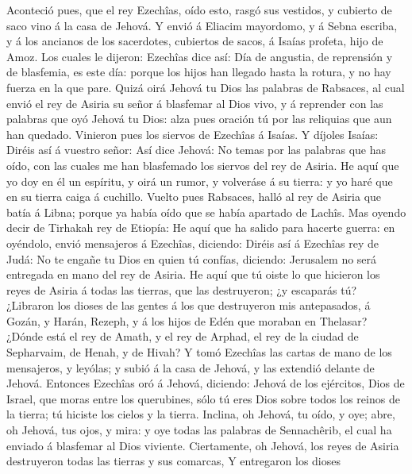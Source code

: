  Aconteció pues, que el rey Ezechîas, oído esto, rasgó sus
vestidos, y cubierto de saco vino á la casa de Jehová.  Y
envió á Eliacim mayordomo, y á Sebna escriba, y á los ancianos de los
sacerdotes, cubiertos de sacos, á Isaías profeta, hijo de Amoz.
 Los cuales le dijeron: Ezechîas dice así: Día de angustia,
de reprensión y de blasfemia, es este día: porque los hijos han llegado
hasta la rotura, y no hay fuerza en la que pare.  Quizá oirá
Jehová tu Dios las palabras de Rabsaces, al cual envió el rey de Asiria
su señor á blasfemar al Dios vivo, y á reprender con las palabras que
oyó Jehová tu Dios: alza pues oración tú por las reliquias que aun han
quedado.  Vinieron pues los siervos de Ezechîas á Isaías.
 Y díjoles Isaías: Diréis así á vuestro señor: Así dice
Jehová: No temas por las palabras que has oído, con las cuales me han
blasfemado los siervos del rey de Asiria.  He aquí que yo
doy en él un espíritu, y oirá un rumor, y volveráse á su tierra: y yo
haré que en su tierra caiga á cuchillo.  Vuelto pues
Rabsaces, halló al rey de Asiria que batía á Libna; porque ya había oído
que se había apartado de Lachîs.  Mas oyendo decir de
Tirhakah rey de Etiopía: He aquí que ha salido para hacerte guerra: en
oyéndolo, envió mensajeros á Ezechîas, diciendo:  Diréis
así á Ezechîas rey de Judá: No te engañe tu Dios en quien tú confías,
diciendo: Jerusalem no será entregada en mano del rey de Asiria.
 He aquí que tú oiste lo que hicieron los reyes de Asiria á
todas las tierras, que las destruyeron; ¿y escaparás tú? 
¿Libraron los dioses de las gentes á los que destruyeron mis
antepasados, á Gozán, y Harán, Rezeph, y á los hijos de Edén que moraban
en Thelasar?  ¿Dónde está el rey de Amath, y el rey de
Arphad, el rey de la ciudad de Sepharvaim, de Henah, y de Hivah?
 Y tomó Ezechîas las cartas de mano de los mensajeros, y
leyólas; y subió á la casa de Jehová, y las extendió delante de Jehová.
 Entonces Ezechîas oró á Jehová, diciendo: 
Jehová de los ejércitos, Dios de Israel, que moras entre los querubines,
sólo tú eres Dios sobre todos los reinos de la tierra; tú hiciste los
cielos y la tierra.  Inclina, oh Jehová, tu oído, y oye;
abre, oh Jehová, tus ojos, y mira: y oye todas las palabras de
Sennachêrib, el cual ha enviado á blasfemar al Dios viviente.
 Ciertamente, oh Jehová, los reyes de Asiria destruyeron
todas las tierras y sus comarcas,  Y entregaron los dioses
